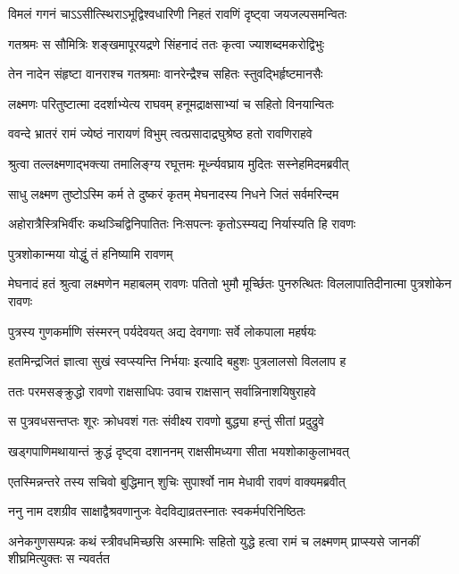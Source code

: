 \twolineshloka
{विमलं गगनं चाऽऽसीत्स्थिराऽभूद्विश्वधारिणी}
{निहतं रावणिं दृष्ट्वा जयजल्पसमन्वितः} %

\twolineshloka
{गतश्रमः स सौमित्रिः शङ्खमापूरयद्रणे}
{सिंहनादं ततः कृत्वा ज्याशब्दमकरोद्विभुः} %

\twolineshloka
{तेन नादेन संहृष्टा वानराश्च गतश्रमाः}
{वानरेन्द्रैश्च सहितः स्तुवद्भिर्हृष्टमानसैः} %

\twolineshloka
{लक्ष्मणः परितुष्टात्मा ददर्शाभ्येत्य राघवम्}
{हनूमद्राक्षसाभ्यां च सहितो विनयान्वितः} %

\twolineshloka
{ववन्दे भ्रातरं रामं ज्येष्ठं नारायणं विभुम्}
{त्वत्प्रसादाद्रघुश्रेष्ठ हतो रावणिराहवे} %

\twolineshloka
{श्रुत्वा तल्लक्ष्मणाद्भक्त्या तमालिङ्ग्य रघूत्तमः}
{मूर्ध्न्यवघ्राय मुदितः सस्नेहमिदमब्रवीत्} %

\twolineshloka
{साधु लक्ष्मण तुष्टोऽस्मि कर्म ते दुष्करं कृतम्}
{मेघनादस्य निधने जितं सर्वमरिन्दम} %

\twolineshloka
{अहोरात्रैस्त्रिभिर्वीरः कथञ्चिद्विनिपातितः}
{निःसपत्नः कृतोऽस्म्यद्य निर्यास्यति हि रावणः} %

{पुत्रशोकान्मया योद्धुं तं हनिष्यामि रावणम्} %


\threelineshloka
{मेघनादं हतं श्रुत्वा लक्ष्मणेन महाबलम्}
{रावणः पतितो भुमौ मूर्च्छितः पुनरुत्थितः}
{विललापातिदीनात्मा पुत्रशोकेन रावणः} %

\twolineshloka
{पुत्रस्य गुणकर्माणि संस्मरन् पर्यदेवयत्}
{अद्य देवगणाः सर्वे लोकपाला महर्षयः} %

\twolineshloka
{हतमिन्द्रजितं ज्ञात्वा सुखं स्वप्स्यन्ति निर्भयाः}
{इत्यादि बहुशः पुत्रलालसो विललाप ह} %

\twolineshloka
{ततः परमसङ्क्रुद्धो रावणो राक्षसाधिपः}
{उवाच राक्षसान् सर्वान्निनाशयिषुराहवे} %

\twolineshloka
{स पुत्रवधसन्तप्तः शूरः क्रोधवशं गतः}
{संवीक्ष्य रावणो बुद्ध्या हन्तुं सीतां प्रदुद्रुवे} %

\twolineshloka
{खड्गपाणिमथायान्तं क्रुद्धं दृष्ट्वा दशाननम्}
{राक्षसीमध्यगा सीता भयशोकाकुलाभवत्} %

\twolineshloka
{एतस्मिन्नन्तरे तस्य सचिवो बुद्धिमान् शुचिः}
{सुपार्श्वो नाम मेधावी रावणं वाक्यमब्रवीत्} %

\twolineshloka
{ननु नाम दशग्रीव साक्षाद्वैश्रवणानुजः}
{वेदविद्याव्रतस्नातः स्वकर्मपरिनिष्ठितः} %

\threelineshloka
{अनेकगुणसम्पन्नः कथं स्त्रीवधमिच्छसि}
{अस्माभिः सहितो युद्धे हत्वा रामं च लक्ष्मणम्}
{प्राप्स्यसे जानकीं शीघ्रमित्युक्तः स न्यवर्तत} %

